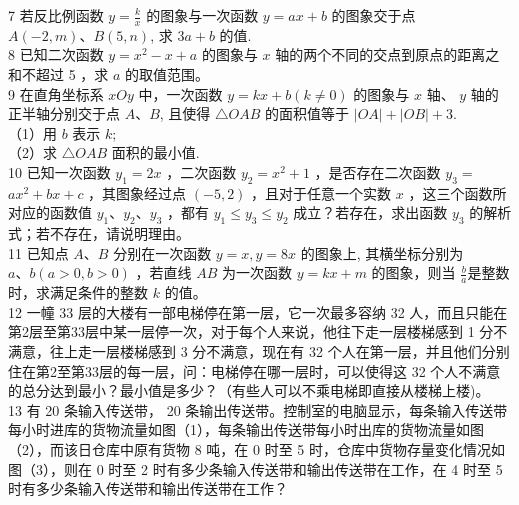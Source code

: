 \documentclass[10pt]{article}
\begin{document}
7 若反比例函数 $y=\frac{k}{x}$ 的图象与一次函数 $y=a x+b$ 的图象交于点 $A(-2, m) 、 B(5, n)$, 求 $3 a+b$ 的值.\\
8 已知二次函数 $y=x^{2}-x+a$ 的图象与 $x$ 轴的两个不同的交点到原点的距离之和不超过 5 ，求 $a$ 的取值范围。\\
9 在直角坐标系 $x O y$ 中，一次函数 $y=k x+b(k \neq 0)$ 的图象与 $x$ 轴、 $y$ 轴的正半轴分别交于点 $A 、 B$, 且使得 $\triangle O A B$ 的面积值等于 $|O A|+|O B|+3$.\\
（1）用 $b$ 表示 $k$;\\
（2）求 $\triangle O A B$ 面积的最小值.\\
10 已知一次函数 $y_{1}=2 x$ ，二次函数 $y_{2}=x^{2}+1$ ，是否存在二次函数 $y_{3}=$ $a x^{2}+b x+c$ ，其图象经过点 $(-5,2)$ ，且对于任意一个实数 $x$ ，这三个函数所对应的函数值 $y_{1} 、 y_{2} 、 y_{3}$ ，都有 $y_{1} \leqslant y_{3} \leqslant y_{2}$ 成立？若存在，求出函数 $y_{3}$ 的解析式；若不存在，请说明理由。\\
11 已知点 $A 、 B$ 分别在一次函数 $y=x, y=8 x$ 的图象上, 其横坐标分别为 $a 、 b(a>0, b>0)$ ，若直线 $A B$ 为一次函数 $y=k x+m$ 的图象，则当 $\frac{b}{a}$是整数时，求满足条件的整数 $k$ 的值。\\
12 一幢 33 层的大楼有一部电梯停在第一层，它一次最多容纳 32 人，而且只能在第2层至第33层中某一层停一次，对于每个人来说，他往下走一层楼梯感到 1 分不满意，往上走一层楼梯感到 3 分不满意，现在有 32 个人在第一层，并且他们分别住在第2至第33层的每一层，问：电梯停在哪一层时，可以使得这 32 个人不满意的总分达到最小？最小值是多少？（有些人可以不乘电梯即直接从楼梯上楼)。\\
13 有 20 条输入传送带， 20 条输出传送带。控制室的电脑显示，每条输入传送带每小时进库的货物流量如图（1），每条输出传送带每小时出库的货物流量如图（2），而该日仓库中原有货物 8 吨，在 0 时至 5 时，仓库中货物存量变化情况如图（3），则在 0 时至 2 时有多少条输入传送带和输出传送带在工作，在 4 时至 5 时有多少条输入传送带和输出传送带在工作？\\
\end{document}
